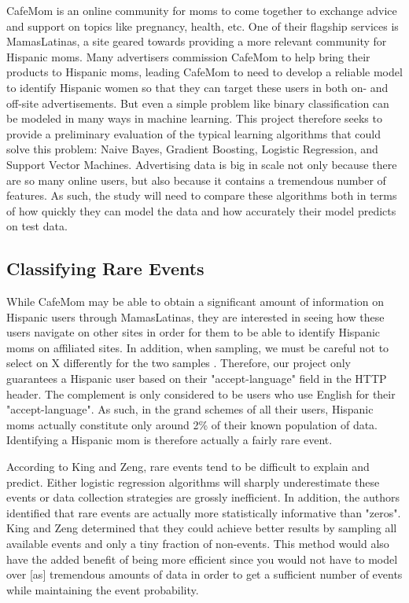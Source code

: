 \documentclass[twoside]{article}
\begin{document}
\begin{multicols}{2}
CafeMom is an online community for moms to come together to exchange advice and support on topics like pregnancy, health, etc. One of their flagship services is MamasLatinas, a site geared towards providing a more relevant community for Hispanic moms. Many advertisers commission CafeMom to help bring their products to Hispanic moms, leading CafeMom to need to develop a reliable model to identify Hispanic women so that they can target these users in both on- and off-site advertisements. But even a simple problem like binary classification can be modeled in many ways in machine learning. This project therefore seeks to provide a preliminary evaluation of the typical learning algorithms that could solve this problem: Naive Bayes, Gradient Boosting, Logistic Regression, and Support Vector Machines. Advertising data is big in scale not only because there are so many online users, but also because it contains a tremendous number of features. As such, the study will need to compare these algorithms both in terms of how quickly they can model the data and how accurately their model predicts on test data.

\subsection{Classifying Rare Events}
While CafeMom may be able to obtain a significant amount of information on Hispanic users through MamasLatinas, they are interested in seeing how these users navigate on other sites in order for them to be able to identify Hispanic moms on affiliated sites. In addition, when sampling, we must be careful not to select on X differently for the two samples \cite{1}. Therefore, our project only guarantees a Hispanic user based on their "accept-language" field in the HTTP header. The complement is only considered to be users who use English for their "accept-language". As such, in the grand schemes of all their users, Hispanic moms actually constitute only around 2\% of their known population of data. Identifying a Hispanic mom is therefore actually a fairly rare event.

According to King and Zeng, rare events tend to be difficult to explain and predict\cite{1}. Either logistic regression algorithms will sharply underestimate these events or data collection strategies are grossly inefficient\cite{1}. In addition, the authors identified that rare events are actually more statistically informative than "zeros"\cite{1}. King and Zeng determined that they could achieve better results by sampling all available events and only a tiny fraction of non-events. This method would also have the added benefit of being more efficient since you would not have to model over [as] tremendous amounts of data in order to get a sufficient number of events while maintaining the event probability.


\end{multicols}
\end{document}
